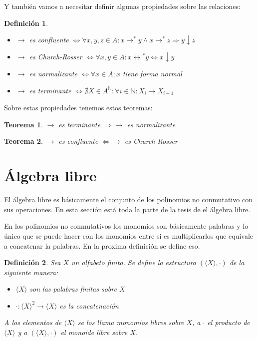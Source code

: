 \documentclass{report}
\theoremstyle{customstyle}
\newtheorem{definition}{Definición}[chapter]
\newtheorem{theorem}{Teorema}[chapter]
\theoremstyle{factstyle}
\begin{document}
Y también vamos a necesitar definir algunas propiedades sobre las relaciones:

\begin{definition}\
  \begin{itemize}
    \item $→$ es confluente $⇔ ∀x, y, z ∈ A : x →^* y ∧ x →^*z ⇒ y ↓ z$
    \item $→$ es Church-Rosser $⇔ ∀x, y ∈ A : x ↔️^* y ⇔ x ↓ y$
    \item $→$ es normalizante $⇔ ∀x ∈ A : x$ tiene forma normal
    \item $→$ es terminante $⇔ ∄X ∈ A^ℕ : ∀i ∈ ℕ : X_i → X_{i + 1}$
  \end{itemize}
\end{definition}

Sobre estas propiedades tenemos estos teoremas:

\begin{theorem}\label{thm:terminante ⇒ normalizante}
  $→$ es terminante $⇒ →$ es normalizante
\end{theorem}

\begin{theorem}\label{thm:confluente ⇔ Church-Rosser}
  $→$ es confluente $⇔ →$ es Church-Rosser
\end{theorem}

\section{Álgebra libre}

El álgebra libre es básicamente el conjunto de los polinomios no conmutativo con sus operaciones. En esta sección está toda la parte de la tesis de el álgebra libre.

En los polinomios no conmutativos los monomios son básicamente palabras y lo único que se puede hacer con los monomios entre si es multiplicarlos que equivale a concatenar la palabras. En la proxima definición se define eso.

\begin{definition}
  Sea $X$ un alfabeto finito. Se define la estructura $(⟨X⟩, ·)$ de la siguiente manera:
  \begin{itemize}
    \item $⟨X⟩$ son las palabras finitas sobre $X$
    \item $· : ⟨X⟩^2 → ⟨X⟩$ es la concatenación
  \end{itemize}
  A los elementos de $⟨X⟩$ se los llama monomios libres sobre $X$, a $·$ el producto de $⟨X⟩$ y a $(⟨X⟩, ·)$ el monoide libre sobre $X$.
\end{definition}
\end{document}
